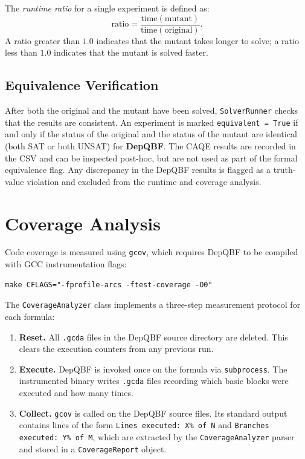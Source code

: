 The \emph{runtime ratio} for a single experiment is defined as:
\[
  \text{ratio} = \frac{\text{time}(\text{mutant})}{\text{time}(\text{original})}.
\]
A ratio greater than $1.0$ indicates that the mutant takes longer to solve; a ratio less than $1.0$ indicates that the mutant is solved faster.

\subsection{Equivalence Verification}\label{sec:equivalence-verification-impl}

After both the original and the mutant have been solved, 
\texttt{SolverRunner} checks that the results are consistent. 
An experiment is marked \texttt{equivalent = True} if and only 
if the status of the original and the status of the mutant are 
identical (both SAT or both UNSAT) for \textbf{DepQBF}. The CAQE 
results are recorded in the CSV and can be inspected post-hoc, 
but are not used as part of the formal equivalence flag. Any 
discrepancy in the DepQBF results is flagged as a truth-value 
violation and excluded from the runtime and coverage analysis.

\section{Coverage Analysis}\label{sec:coverage-impl}

Code coverage is measured using \texttt{gcov}, which requires DepQBF to be compiled with GCC instrumentation flags:

\begin{listing}[H]
\caption{DepQBF instrumented build command.}
\label{lst:gcov-build}
\begin{verbatim}
make CFLAGS="-fprofile-arcs -ftest-coverage -O0"
\end{verbatim}
\end{listing}

The \texttt{CoverageAnalyzer} class implements a three-step measurement protocol for each formula:

\begin{enumerate}
  \item \textbf{Reset.} All \texttt{.gcda} files in the DepQBF source directory are deleted. This clears the execution counters from any previous run.
  \item \textbf{Execute.} DepQBF is invoked once on the formula via \texttt{subprocess}. The instrumented binary writes \texttt{.gcda} files recording which basic blocks were executed and how many times.
  \item \textbf{Collect.} \texttt{gcov} is called on the DepQBF source files. Its standard output contains lines of the form \texttt{Lines executed: X\% of N} and \texttt{Branches executed: Y\% of M}, which are extracted by the \texttt{CoverageAnalyzer} parser and stored in a \texttt{CoverageReport} object.
\end{enumerate}

